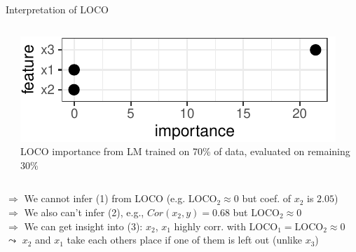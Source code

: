 \documentclass[10pt,compress,t,notes=noshow, xcolor=table]{beamer}
\begin{document}
\begin{frame}{Interpretation of LOCO}
\begin{columns}[c, totalwidth=\textwidth]
\begin{column}{0.42\textwidth}
\end{column}
\begin{column}{0.58\textwidth}
\centering
\includegraphics[width=0.9\linewidth]{figure_man/simulation_loco}\\
LOCO importance from LM trained on 70\% of data, evaluated on remaining 30\%


\end{column}
\end{columns}

\lz\pause

$\Rightarrow$ We cannot infer (1) from LOCO (e.g. $\text{LOCO}_2 \approx 0$ but coef. of $x_2$ is $2.05$)\\\pause
$\Rightarrow$ We also can't infer (2), e.g., $Cor(x_2, y) = 0.68$ but $\text{LOCO}_2 \approx 0$\\\pause
$\Rightarrow$ We can get insight into (3): $x_2$, $x_1$ highly corr. with $\text{LOCO}_1 = \text{LOCO}_2  \approx 0$ \\
\phantom{$\Rightarrow$} $\leadsto$ $x_2$ and $x_1$ take each others place if one of them is left out (unlike $x_3$)
\end{frame}
\end{document}

